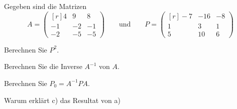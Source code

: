 Gegeben sind die Matrizen
\[
A
=
\begin{pmatrix*}[r]
 4& 9& 8\\
-1&-2&-1\\
-2&-5&-5
\end{pmatrix*}
\qquad\text{und}\qquad
P
=
\begin{pmatrix*}[r]
-7&-16&-8\\
 1&  3& 1\\
 5& 10& 6
\end{pmatrix*}
\]
\begin{teilaufgaben}
\item Berechnen Sie $P^2$.
\item Berechnen Sie die Inverse $A^{-1}$ von $A$.
\item Berechnen Sie $P_0=A^{-1}PA$.
\item Warum erklärt c) das Resultat von a)
\end{teilaufgaben}


